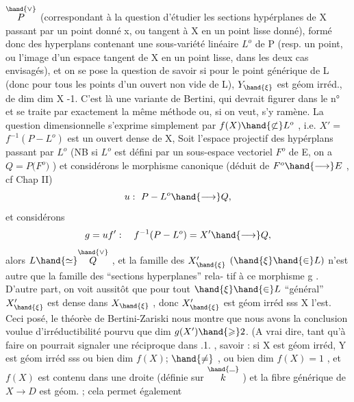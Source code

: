 
$\overset{\hand{\vee}}{P}$ (correspondant à la question d'étudier les sections hypérplanes de X
passant par un point donné x, ou tangent à X en un point lisse donné),
formé donc des hyperplans contenant une sous-variété linéaire $L^{o}$ de P
(resp. un point,  ou l'image d'un espace tangent de X en un point lisse,
dans les deux cas envisagés), et on se pose la question de savoir si
pour le point générique \hand{$\xi$} de L  (donc pour tous les points d'un ouvert
non vide de L),  $Y_{\hand{\xi}}$  est  géom irréd., de
dim  dim X -1.   C'est là une variante  de Bertini, qui devrait figurer
dans  le n°  et se traite par exactement la même méthode ou, si on veut, s'y ramène.  La question
dimensionnelle s'exprime simplement par  $f(X)\hand{\not\subset} L^{o}$ , 
i.e.  $X' =$  $f^{-1}(P - L^{o})$   est un ouvert dense de X, 
Soit  l'espace projectif des hypérplans passant par $L^{o}$  (NB si  $L^{o}$ est
défini par un sous-espace vectoriel $F^{o}$ de E,  on a   $Q = P($$F^{o})$ ) et
considérons le morphisme  canonique  (déduit de  $F^{o}\hand{\longrightarrow} E$ , cf
Chap II)
\[ u :\ P - L^{o} \hand{\longrightarrow} Q, \]
et considérons
\[ g = u f' :\quad f^{-1}(P - L^{o}) = X' \hand{\longrightarrow} Q , \]
alors   $L \hand{\simeq} \overset{\hand{\vee}}{Q}$ ,  et la famille des
$X'_{\hand{\xi}}$  $(\hand{\xi}\hand{\in} L)$  n'est autre que la famille des ``sections hyperplanes'' rela-%
tif à ce morphisme  g . D'autre part, on voit aussitôt que pour tout
$\hand{\xi}\hand{\in} L$  ``général''  $X'_{\hand{\xi}}$ est dense dans $X_{\hand{\xi}}$ , donc  $X'_{\hand{\xi}}$  est géom irréd sss
X  l'est.  Ceci posé,  le théorèe de Bertini-Zariski nous montre que
nous avons la conclusion voulue  d'irréductibilité pourvu que
dim $g(X') \hand{\geqslant} 2$. (A vrai dire, tant qu'à faire on pourrait signaler une
réciproque dans .1. , savoir :  si X est géom irréd, Y  est
géom irréd sss  ou bien  dim $f(X)$; $\hand{\neq}$ , ou bien  dim $f(X)=1$ , et $f(X)$
est contenu dans une droite (définie sur $\overset{\hand{\rule{0.6em}{0.35pt}}}{k}$ ) et la fibre générique de $X\to D$ est géom. \hand{)}; cela permet également


